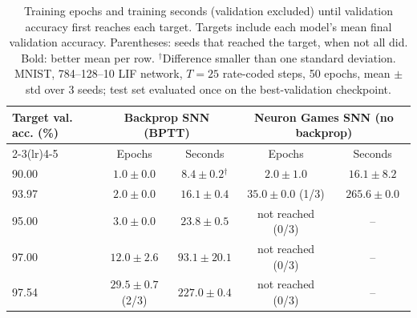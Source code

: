 \begin{table}[t]
\centering
\small
\caption{Training epochs and training seconds (validation excluded) until validation accuracy first reaches each target. Targets include each model's mean final validation accuracy. Parentheses: seeds that reached the target, when not all did. Bold: better mean per row. $^\dagger$Difference smaller than one standard deviation. MNIST, 784--128--10 LIF network, $T=25$ rate-coded steps, 50 epochs, mean $\pm$ std over 3 seeds; test set evaluated once on the best-validation checkpoint.}
\label{tab:ng-time-to-accuracy}
\begin{tabular}{lcccc}
\toprule
\multirow{2}{*}{Target val. acc. (\%)} & \multicolumn{2}{c}{Backprop SNN (BPTT)} & \multicolumn{2}{c}{Neuron Games SNN (no backprop)} \\
\cmidrule(lr){2-3}\cmidrule(lr){4-5}
 & Epochs & Seconds & Epochs & Seconds \\
\midrule
90.00 & $\boldsymbol{1.0 \pm 0.0}$ & $\boldsymbol{8.4 \pm 0.2}$$^\dagger$ & $2.0 \pm 1.0$ & $16.1 \pm 8.2$ \\
93.97 & $\boldsymbol{2.0 \pm 0.0}$ & $\boldsymbol{16.1 \pm 0.4}$ & $35.0 \pm 0.0$ (1/3) & $265.6 \pm 0.0$ \\
95.00 & $\boldsymbol{3.0 \pm 0.0}$ & $\boldsymbol{23.8 \pm 0.5}$ & not reached (0/3) & -- \\
97.00 & $\boldsymbol{12.0 \pm 2.6}$ & $\boldsymbol{93.1 \pm 20.1}$ & not reached (0/3) & -- \\
97.54 & $\boldsymbol{29.5 \pm 0.7}$ (2/3) & $\boldsymbol{227.0 \pm 0.4}$ & not reached (0/3) & -- \\
\bottomrule
\end{tabular}
\end{table}


